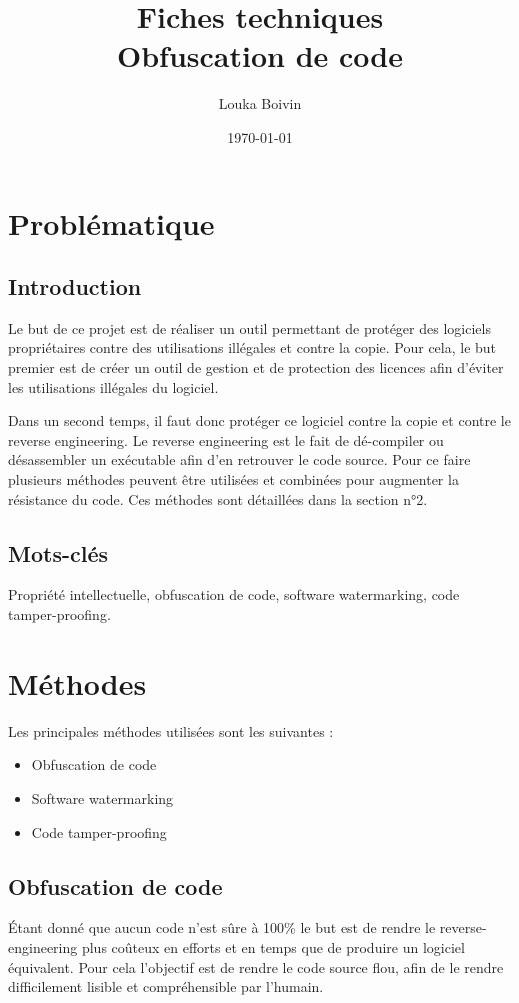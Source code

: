 \documentclass{article}
\title{
    \Huge
    Fiches techniques\\
    Obfuscation de code
}
\author{\huge Louka Boivin}
\date{\huge \today}
\begin{document}
\maketitle
\newpage

\section{Problématique}                                                                                 

\subsection{Introduction}

Le but de ce projet est de réaliser un outil permettant de protéger des logiciels propriétaires contre des utilisations illégales et contre la copie.
Pour cela, le but premier est de créer un outil de gestion et de protection des licences afin d'éviter les utilisations illégales du logiciel.

Dans un second temps, il faut donc protéger ce logiciel contre la copie et contre le reverse engineering. Le reverse engineering est le fait de dé-compiler ou désassembler un exécutable afin d'en retrouver le code source.
Pour ce faire plusieurs méthodes peuvent être utilisées et combinées pour augmenter la résistance du code. Ces méthodes sont détaillées dans la section n°2.

\subsection{Mots-clés}
Propriété intellectuelle, obfuscation de code, software watermarking, code tamper-proofing.
\vspace{1cm}

\section{Méthodes}

Les principales méthodes utilisées sont les suivantes :
\begin{itemize}
    \item Obfuscation de code
    \item Software watermarking
    \item Code tamper-proofing
\end{itemize}
\newpage

\subsection{Obfuscation de code}
Étant donné que aucun code n'est sûre à 100\% le but est de rendre le reverse-engineering plus coûteux en efforts et en temps que de produire un logiciel équivalent. Pour cela l'objectif est de rendre le code source flou, afin de le rendre difficilement lisible et compréhensible par l'humain.
\end{document}
